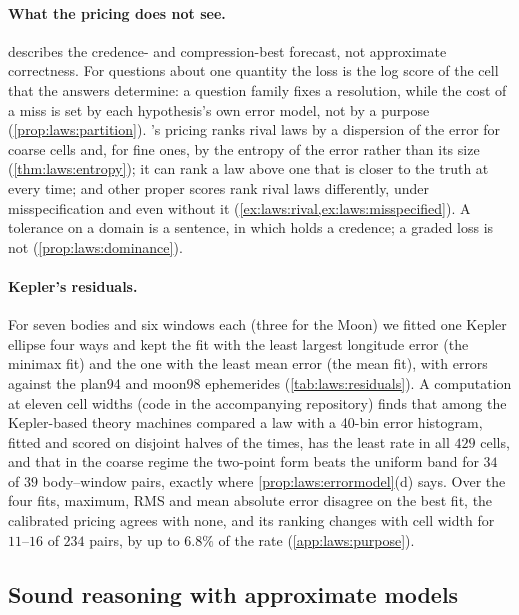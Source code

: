 \paragraph{What the pricing does not see.}\label{par:laws:purpose} describes the credence- and compression-best forecast, not approximate correctness. For questions about one quantity the loss is the log score of the cell that the answers determine: a question family fixes a resolution, while the cost of a miss is set by each hypothesis's own error model, not by a purpose (\cref{prop:laws:partition}). \SAIabbr's pricing ranks rival laws by a dispersion of the error for coarse cells and, for fine ones, by the entropy of the error rather than its size (\cref{thm:laws:entropy}); it can rank a law above one that is closer to the truth at every time; and other proper scores rank rival laws differently, under misspecification and even without it (\cref{ex:laws:rival,ex:laws:misspecified}). A tolerance on a domain is a sentence, in which \SAIabbr holds a credence; a graded loss is not (\cref{prop:laws:dominance}).

\paragraph{Kepler's residuals.} For seven bodies and six windows each (three for the Moon) we fitted one Kepler ellipse four ways and kept the fit with the least largest longitude error (the minimax fit) and the one with the least mean error (the mean fit), with errors against the plan94 and moon98 ephemerides (\cref{tab:laws:residuals}). A computation at eleven cell widths (code in the accompanying repository) finds that among the Kepler-based theory machines compared a law with a 40-bin error histogram, fitted and scored on disjoint halves of the times, has the least rate in all $429$ cells, and that in the coarse regime the two-point form beats the uniform band for $34$ of $39$ body--window pairs, exactly where \cref{prop:laws:errormodel}(d) says. Over the four fits, maximum, RMS and mean absolute error disagree on the best fit, the calibrated pricing agrees with none, and its ranking changes with cell width for $11$--$16$ of $234$ pairs, by up to $6.8\%$ of the rate (\cref{app:laws:purpose}).

\subsection{Sound reasoning with approximate models}\label{sec:laws:sound}

